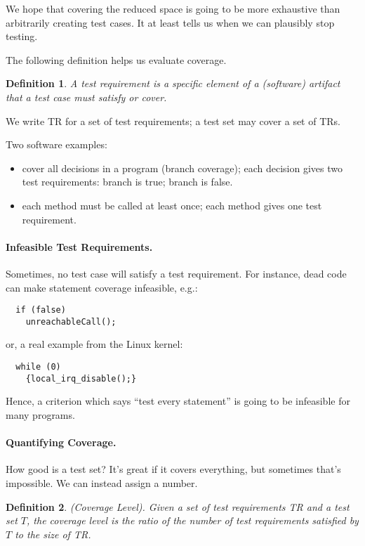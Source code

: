 \documentclass[11pt]{article}
\newtheorem{defn}{Definition}
\begin{document}
We hope that covering the reduced space is going to be more exhaustive than
arbitrarily creating test cases. It at least tells us when we can plausibly
stop testing.

The following definition helps us evaluate coverage.

\begin{defn}
A \emph{test requirement} is a specific element of a (software)
artifact that a test case must satisfy or cover.
\end{defn}
We write TR for a set of test requirements; a test set may cover a
set of TRs.

Two software examples:
\begin{itemize}
\item cover all decisions in a program (branch coverage); each decision 
gives two test requirements: branch is true; branch is false.
\item each method must be called at least once; each method gives one test
requirement.
\end{itemize}

\paragraph{Infeasible Test Requirements.} Sometimes, no test case will 
satisfy a test requirement. For instance, dead code can make statement
coverage infeasible, e.g.:

\begin{verbatim}
  if (false)
    unreachableCall();
\end{verbatim}

or, a real example from the Linux kernel:
\begin{verbatim}
  while (0)
    {local_irq_disable();}
\end{verbatim}

Hence, a criterion which says ``test every statement'' is going to be
infeasible for many programs.

\paragraph{Quantifying Coverage.} How good is a test set? It's great if it
covers everything, but sometimes that's impossible.
We can instead assign a number.
\begin{defn}
(Coverage Level). Given a set of test requirements TR and a test set $T$,
the coverage level is the ratio of the number of test requirements
satisfied by $T$ to the size of TR.
\end{defn}
\end{document}
